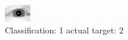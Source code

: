 \begin{figure}[h!]
\begin{center}
\includegraphics[width=0.60\columnwidth]{figures/ID3068_class_1_target_2.png}
\end{center}
\caption{ Classification: 1 actual target: 2}
\label{fig:ID3068_class_1_target_2}
\end{figure}
